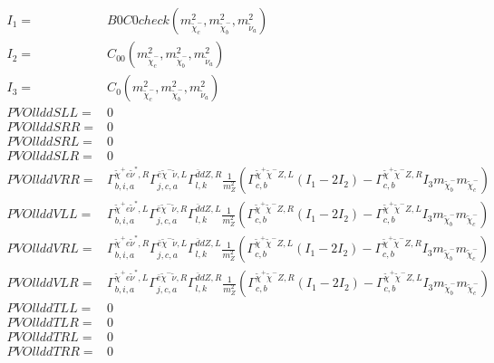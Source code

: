 \documentclass[A4,landscape]{article}
\begin{document}
\begin{align} 
I_1= & B0C0check(m^2_{\tilde{\chi}^-_{{c}}}, m^2_{\tilde{\chi}^-_{{b}}}, m^2_{\tilde{\nu}_{{a}}}) \\ 
I_2= & C_{00}(m^2_{\tilde{\chi}^-_{{c}}}, m^2_{\tilde{\chi}^-_{{b}}}, m^2_{\tilde{\nu}_{{a}}}) \\ 
I_3= & C_0(m^2_{\tilde{\chi}^-_{{c}}}, m^2_{\tilde{\chi}^-_{{b}}}, m^2_{\tilde{\nu}_{{a}}}) \\ 
  PVOllddSLL= & 0 \\ 
  PVOllddSRR= & 0 \\ 
  PVOllddSRL= & 0 \\ 
  PVOllddSLR= & 0 \\ 
  PVOllddVRR= &  \Gamma^{\tilde{\chi}^+e \tilde{\nu}^*,R}_{b, i, a} \Gamma^{\bar{e}\tilde{\chi}^- \tilde{\nu} ,L}_{j, c, a} \Gamma^{\bar{d}d Z ,R}_{l, k} \frac{1}{m^2_{Z}} (\Gamma^{\tilde{\chi}^+\tilde{\chi}^- Z ,L}_{c, b} (I_1 - 2 I_2) - \Gamma^{\tilde{\chi}^+\tilde{\chi}^- Z ,R}_{c, b} I_3 m_{\tilde{\chi}^-_{{b}}} m_{\tilde{\chi}^-_{{c}}}) \\ 
  PVOllddVLL= &  \Gamma^{\tilde{\chi}^+e \tilde{\nu}^*,L}_{b, i, a} \Gamma^{\bar{e}\tilde{\chi}^- \tilde{\nu} ,R}_{j, c, a} \Gamma^{\bar{d}d Z ,L}_{l, k} \frac{1}{m^2_{Z}} (\Gamma^{\tilde{\chi}^+\tilde{\chi}^- Z ,R}_{c, b} (I_1 - 2 I_2) - \Gamma^{\tilde{\chi}^+\tilde{\chi}^- Z ,L}_{c, b} I_3 m_{\tilde{\chi}^-_{{b}}} m_{\tilde{\chi}^-_{{c}}}) \\ 
  PVOllddVRL= &  \Gamma^{\tilde{\chi}^+e \tilde{\nu}^*,R}_{b, i, a} \Gamma^{\bar{e}\tilde{\chi}^- \tilde{\nu} ,L}_{j, c, a} \Gamma^{\bar{d}d Z ,L}_{l, k} \frac{1}{m^2_{Z}} (\Gamma^{\tilde{\chi}^+\tilde{\chi}^- Z ,L}_{c, b} (I_1 - 2 I_2) - \Gamma^{\tilde{\chi}^+\tilde{\chi}^- Z ,R}_{c, b} I_3 m_{\tilde{\chi}^-_{{b}}} m_{\tilde{\chi}^-_{{c}}}) \\ 
  PVOllddVLR= &  \Gamma^{\tilde{\chi}^+e \tilde{\nu}^*,L}_{b, i, a} \Gamma^{\bar{e}\tilde{\chi}^- \tilde{\nu} ,R}_{j, c, a} \Gamma^{\bar{d}d Z ,R}_{l, k} \frac{1}{m^2_{Z}} (\Gamma^{\tilde{\chi}^+\tilde{\chi}^- Z ,R}_{c, b} (I_1 - 2 I_2) - \Gamma^{\tilde{\chi}^+\tilde{\chi}^- Z ,L}_{c, b} I_3 m_{\tilde{\chi}^-_{{b}}} m_{\tilde{\chi}^-_{{c}}}) \\ 
  PVOllddTLL= & 0 \\ 
  PVOllddTLR= & 0 \\ 
  PVOllddTRL= & 0 \\ 
  PVOllddTRR= & 0 \\ 
\end{align} 
\end{document}
